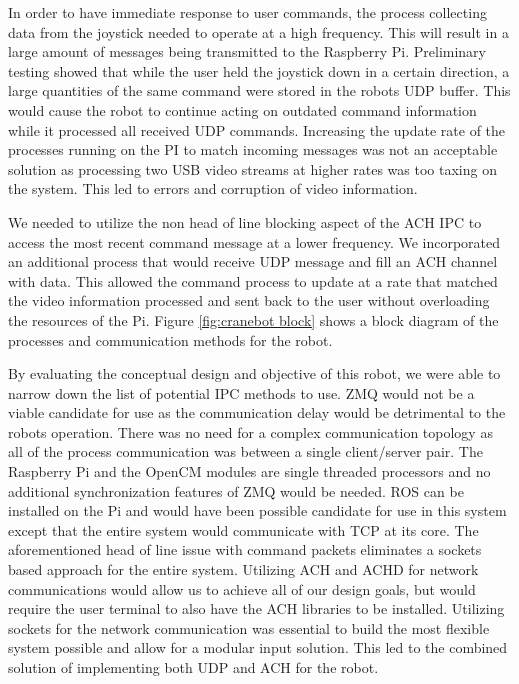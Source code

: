 In order to have immediate response to user commands, the process collecting data from the joystick needed to operate at a high frequency. This will result in a large amount of messages being transmitted to the Raspberry Pi. Preliminary testing showed that while the user held the joystick down in a certain direction, a large quantities of the same command were stored in the robots UDP buffer. This would cause the robot to continue acting on outdated command information while it processed all received UDP commands. Increasing the update rate of the processes running on the PI to match incoming messages was not an acceptable solution as processing two USB video streams at higher rates was too taxing on the system. This led to errors and corruption of video information.

We needed to utilize the non head of line blocking aspect of the ACH IPC to access the most recent command message at a lower frequency. We incorporated an additional process that would receive UDP message and fill an ACH channel with data. This allowed the command process to update at a rate that matched the video information processed and sent back to the user without overloading the resources of the Pi. Figure \ref{fig:cranebot block} shows a block diagram of the processes and communication methods for the robot.


By evaluating the conceptual design and objective of this robot, we were able to narrow down the list of potential IPC methods to use. ZMQ would not be a viable candidate for use as the communication delay would be detrimental to the robots operation. There was no need for a complex communication topology as all of the process communication was between a single client/server pair. The Raspberry Pi and the OpenCM modules are single threaded processors and no additional synchronization features of ZMQ would be needed. ROS can be installed on the Pi and would have been possible candidate for use in this system except that the entire system would communicate with TCP at its core. The aforementioned head of line issue with command packets eliminates a sockets based approach for the entire system. Utilizing ACH and ACHD for network communications would allow us to achieve all of our design goals, but would require the user terminal to also have the ACH libraries to be installed. Utilizing sockets for the network communication was essential to build the most flexible system possible and allow for a modular input solution. This led to the combined solution of implementing both UDP and ACH for the robot. 
